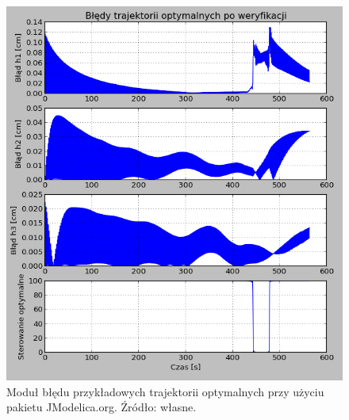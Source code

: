 \begin{figure}[htp]
    \centering
    \includegraphics{Grafika/plot_5_5_6-30_30_25-raw-error-350}
    \caption{Moduł błędu przykładowych trajektorii optymalnych przy użyciu pakietu JModelica.org. Źródło: własne.}
    \label{fig:plot556-303025-raw-error-350}
\end{figure}


